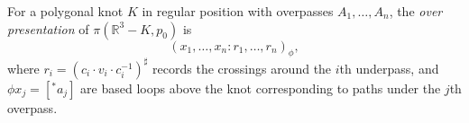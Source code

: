 For a polygonal knot $K$ in regular position with overpasses $A_1, \ldots, A_n$, the \textit{over presentation} of $\pi(\mathbb{R}^3 - K, p_0)$ is
$$(x_1, \ldots, x_n : r_1, \ldots, r_n)_\phi,$$
where $r_i = (c_i \cdot v_i \cdot c_i^{-1})^\sharp$ records the crossings around the $i$th underpass, and $\phi x_j = [^*a_j]$ are based loops above the knot corresponding to paths under the $j$th overpass.
